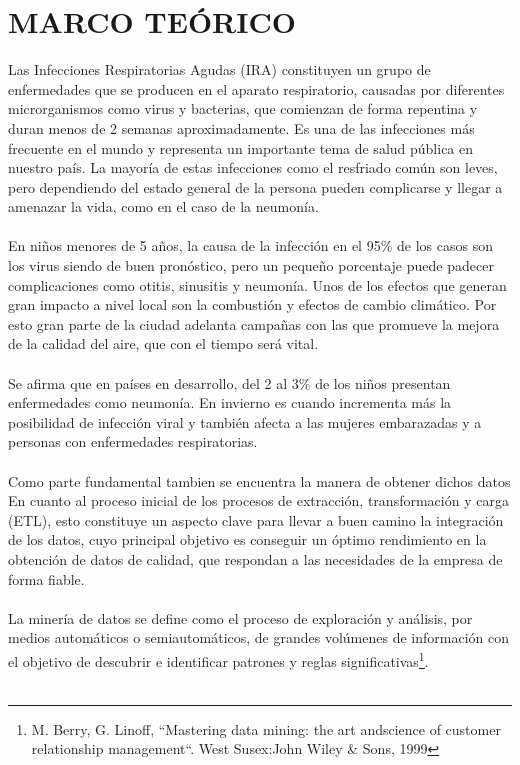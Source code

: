 \documentclass[a4paper,openright,12pt]{book}
\theoremstyle{definition}
\theoremstyle{remark}
\begin{document}
\section{MARCO TEÓRICO}

Las Infecciones Respiratorias Agudas (IRA) constituyen un grupo de enfermedades que se producen en el aparato respiratorio, causadas por diferentes microrganismos como virus y bacterias, que comienzan de forma repentina y duran menos de 2 semanas aproximadamente. Es una de las infecciones más frecuente en el mundo y representa un importante tema de salud pública en nuestro país.  La mayoría de estas infecciones como el resfriado común son leves, pero dependiendo del estado general de la persona pueden complicarse y llegar a amenazar la vida, como en el caso de la neumonía.\\\\
En niños menores de 5 años, la causa de la infección en el  95\% de los casos son los virus siendo de buen pronóstico, pero un pequeño porcentaje puede padecer complicaciones como  otitis, sinusitis y neumonía. Unos de los efectos que generan gran impacto a nivel local son  la combustión y efectos de cambio climático. Por esto  gran parte de la ciudad adelanta campañas con las que promueve la mejora de la calidad del aire, que con el tiempo será vital.\\\\
Se afirma que en países en desarrollo, del 2 al 3\% de los niños presentan enfermedades como neumonía. En invierno es cuando incrementa más la posibilidad de infección viral y también afecta a las mujeres embarazadas y a personas con enfermedades respiratorias.\\\\
Como parte fundamental tambien se encuentra la manera de obtener dichos datos En cuanto al proceso inicial de los procesos de extracción, transformación y carga (ETL), esto constituye un aspecto clave para llevar a buen camino la integración de los datos, cuyo principal objetivo es conseguir un óptimo rendimiento en la obtención de datos de calidad, que respondan a las necesidades de la empresa de forma fiable.\\\\
La minería de datos se define como el proceso de
exploración y análisis, por medios automáticos o
semiautomáticos, de grandes volúmenes de información
con el objetivo de descubrir e identificar patrones y reglas
significativas\footnote{M. Berry, G. Linoff, “Mastering data mining: the art andscience of customer relationship management“. West Susex:John Wiley \& Sons, 1999}.\\\\
\end{document}
